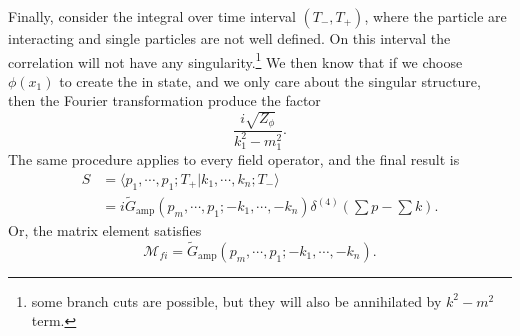 Finally, consider the integral over time interval $(T_-,T_+)$, where the particle are interacting and single particles are not well defined.
On this interval the correlation will not have any singularity.\footnote{some branch cuts are possible, but they will also be annihilated by $k^2-m^2$ term.}
We then know that if we choose $\phi(x_1)$ to create the in state, and we only care about the singular structure, then the Fourier transformation produce the factor
\begin{equation}
	\frac{i\sqrt{Z_\phi}}{k_1^2-m_1^2}.
\end{equation}
The same procedure applies to every field operator, and the final result is
\begin{equation}
\begin{aligned}
	S &= \langle p_1,\cdots,p_1;T_+|k_1,\cdots,k_n;T_-\rangle \\
	&= i\tilde{G}_{\mathrm{amp}}(p_m,\cdots,p_1;-k_1,\cdots,-k_n) \delta^{(4)}\left(\sum p-\sum k \right).
\end{aligned}
\end{equation}
Or, the matrix element satisfies
\begin{equation}
	\mathcal M_{fi} = \tilde{G}_{\mathrm{amp}}(p_m,\cdots,p_1;-k_1,\cdots,-k_n).
\end{equation}


